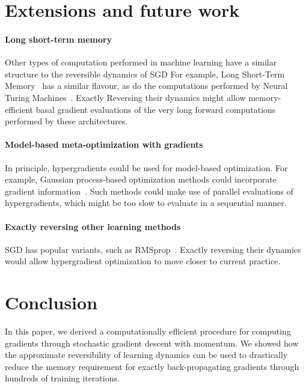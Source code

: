 \documentclass{article}
\newcommand{\primal}{basal }
\begin{document}
\section{Extensions and future work}

\paragraph{Long short-term memory}
Other types of computation performed in machine learning have a similar structure to the reversible dynamics of SGD
For example, Long Short-Term Memory~\citep{hochreiter1997long} has a similar flavour, as do the computations performed by Neural Turing Machines~\citep{graves2014neural}.
Exactly Reversing their dynamics might allow memory-efficient \primal{} gradient evaluations of the very long forward computations performed by these architectures.

\paragraph{Model-based meta-optimization with gradients}
In principle, hypergradients could be used for model-based optimization.
For example, Gaussian process-based optimization methods could incorporate gradient information~\cite{solak2003derivative}.
Such methods could make use of parallel evaluations of hypergradients, which might be too slow to evaluate in a sequential manner.

\paragraph{Exactly reversing other learning methods}
SGD has popular variants, such as RMSprop~\cite{Tieleman2012}.
Exactly reversing their dynamics would allow hypergradient optimization to move closer to current practice.


\section{Conclusion}

In this paper, we derived a computationally efficient procedure for computing gradients through stochastic gradient descent with momentum.
We showed how the approximate reversibility of learning dynamics can be used to drastically reduce the memory requirement for exactly back-propagating gradients through hundreds of training iterations.
\end{document}
